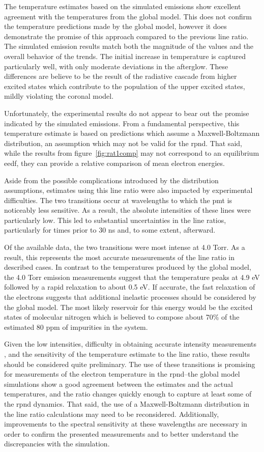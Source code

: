 The temperature estimates based on the simulated emissions show excellent
agreement with the temperatures from the global model. This does not confirm the
temperature predictions made by the global model, however it does demonstrate
the promise of this approach compared to the previous line ratio. The simulated
emission results match both the magnitude of the values and the overall behavior
of the trends. The initial increase in temperature is captured particularly
well, with only moderate deviations in the afterglow. These differences are
believe to be the result of the radiative cascade from higher excited states
which contribute to the population of the upper excited states, mildly violating
the coronal model.

Unfortunately, the experimental results do not appear to bear out the promise
indicated by the simulated emissions. From a fundamental perspective, this
temperature estimate is based on predictions which assume a Maxwell-Boltzmann
distribution, an assumption which may not be valid for the \acs{rpnd}. That
said, while the results from figure~\ref{fig:rat1comp} may not correspond to an
equilibrium \acs{eedf}, they can provide a relative comparison of mean electron
energies.

Aside from the possible complications introduced by the distribution
assumptions, estimates using this line ratio were also impacted by experimental
difficulties. The two transitions occur at wavelengths to which the \acs{pmt} is
noticeably less sensitive. As a result, the absolute intensities of these lines
were particularly low. This led to substantial uncertainties in the line
ratios, particularly for times prior to 30 ns and, to some extent, afterward.

Of the available data, the two transitions were most intense at 4.0 Torr. As a
result, this represents the most accurate measurements of the line ratio in
described cases. In contrast to the temperatures produced by the global model,
the 4.0 Torr emission measurements suggest that the temperature peaks at 4.9 eV
followed by a rapid relaxation to about 0.5 eV. If accurate, the fast relaxation
of the electrons suggests that additional inelastic processes should be
considered by the global model. The most likely reservoir for this energy would
be the excited states of molecular nitrogen which is believed to compose about
70\% of the estimated 80 ppm of impurities in the system.

Given the low intensities, difficulty in obtaining accurate intensity
measurements \cite{Griem2005}, and the sensitivity of the temperature estimate
to the line ratio, these results should be considered quite preliminary. The use
of these transitions is promising for measurements of the electron temperature
in the \acs{rpnd}--the global model simulations show a good agreement between
the estimates and the actual temperatures, and the ratio changes quickly enough
to capture at least some of the \acs{rpnd} dynamics. That said, the use of a
Maxwell-Boltzmann distribution in the line ratio calculations may need to be
reconsidered. Additionally, improvements to the spectral sensitivity at these
wavelengths are necessary in order to confirm the presented measurements and to
better understand the discrepancies with the simulation.

